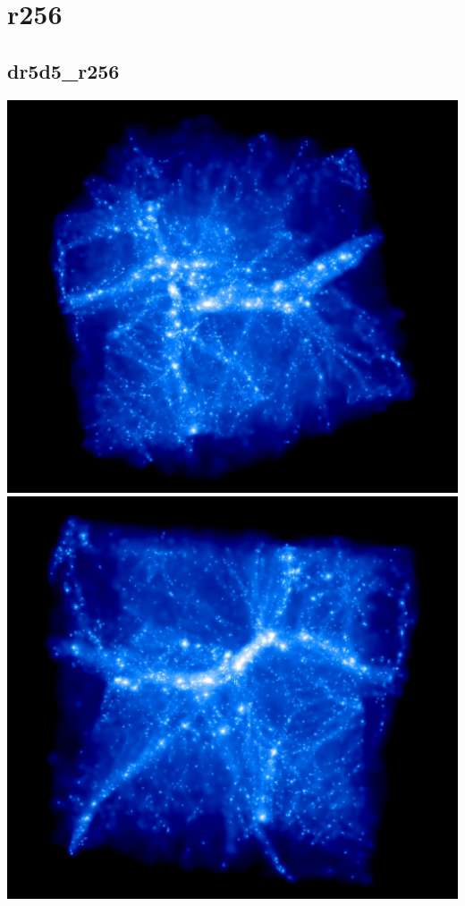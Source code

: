 \section{r256} 

\subsection{dr5d5\_r256}
\includegraphics[scale=0.12]{dr5d5_r256/rotate_00188.jpg} 
\includegraphics[scale=0.12]{dr5d5_r256/rotate_00320.jpg} \\

